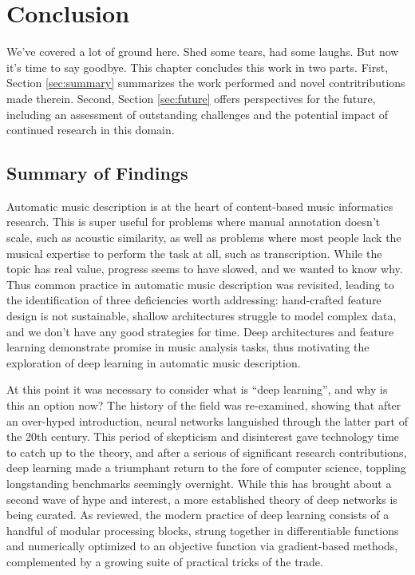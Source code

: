 \graphicspath{{8/figures/}}
\chapter{Conclusion}
\label{chp:conclusion}

We've covered a lot of ground here.
Shed some tears, had some laughs.
But now it's time to say goodbye.
This chapter concludes this work in two parts.
First, Section \ref{sec:summary} summarizes the work performed and novel contritributions made therein.
Second, Section \ref{sec:future} offers perspectives for the future, including an assessment of outstanding challenges and the potential impact of continued research in this domain.

\section{Summary of Findings}

Automatic music description is at the heart of content-based music informatics research.
This is super useful for problems where manual annotation doesn't scale, such as acoustic similarity, as well as problems where most people lack the musical expertise to perform the task at all, such as transcription.
While the topic has real value, progress seems to have slowed, and we wanted to know why.
Thus common practice in automatic music description was revisited, leading to the identification of three deficiencies worth addressing:
hand-crafted feature design is not sustainable, shallow architectures struggle to model complex data, and we don't have any good strategies for time.
Deep architectures and feature learning demonstrate promise in music analysis tasks, thus motivating the exploration of deep learning in automatic music description.

At this point it was necessary to consider what is ``deep learning'', and why is this an option now?
The history of the field was re-examined, showing that after an over-hyped introduction, neural networks languished through the latter part of the 20th century.
This period of skepticism and disinterest gave technology time to catch up to the theory, and after a serious of significant research contributions, deep learning made a triumphant return to the fore of computer science, toppling longstanding benchmarks seemingly overnight.
While this has brought about a second wave of hype and interest, a more established theory of deep networks is being curated.
As reviewed, the modern practice of deep learning consists of a handful of modular processing blocks, strung together in differentiable functions and numerically optimized to an objective function via gradient-based methods, complemented by a growing suite of practical tricks of the trade.

